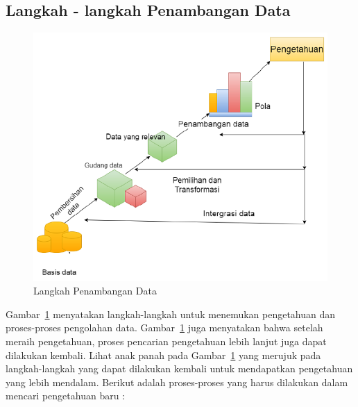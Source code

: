 \subsection{Langkah - langkah Penambangan Data}

\begin{figure}[h]
	\centering
	\includegraphics[scale=0.7]{GambarIO/langkah-data-mining}
	\caption[Langkah Penambangan Data]{Langkah Penambangan Data}
	\label{fig:Langkah Penambangan Data}
\end{figure}

Gambar~\ref{fig:Langkah Penambangan Data} menyatakan langkah-langkah untuk menemukan pengetahuan dan proses-proses pengolahan data. Gambar~\ref{fig:Langkah Penambangan Data} juga menyatakan bahwa setelah meraih pengetahuan, proses pencarian pengetahuan lebih lanjut juga dapat dilakukan kembali. Lihat anak panah pada Gambar~\ref{fig:Langkah Penambangan Data} yang merujuk pada langkah-langkah yang dapat dilakukan kembali untuk mendapatkan pengetahuan yang lebih mendalam. Berikut adalah proses-proses yang harus dilakukan dalam mencari pengetahuan baru \cite{DataMiningIntro:2015}:

